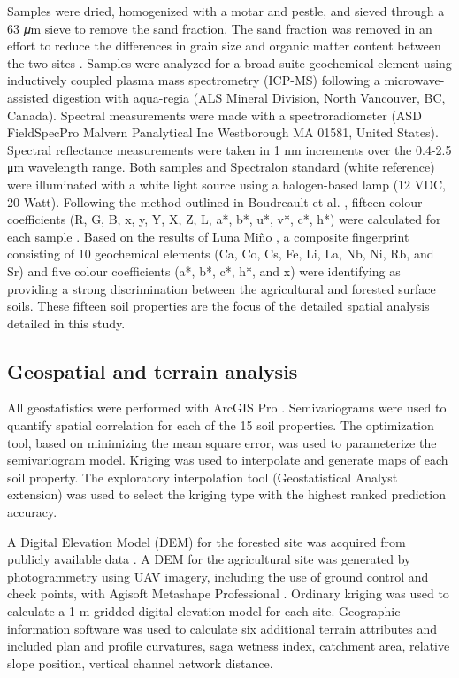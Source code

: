 \documentclass[
  number]{elsarticle}
\begin{document}
Samples were dried, homogenized with a motar and pestle, and sieved
through a 63 𝜇m sieve to remove the sand fraction. The sand fraction was
removed in an effort to reduce the differences in grain size and organic
matter content between the two sites \citep{laceby2017}. Samples were
analyzed for a broad suite geochemical element using inductively coupled
plasma mass spectrometry (ICP-MS) following a microwave-assisted
digestion with aqua-regia (ALS Mineral Division, North Vancouver, BC,
Canada). Spectral measurements were made with a spectroradiometer (ASD
FieldSpecPro Malvern Panalytical Inc Westborough MA 01581, United
States). Spectral reflectance measurements were taken in 1 nm increments
over the 0.4-2.5 μm wavelength range. Both samples and Spectralon
standard (white reference) were illuminated with a white light source
using a halogen-based lamp (12 VDC, 20 Watt). Following the method
outlined in Boudreault et al. \citep{boudreault2018}, fifteen colour
coefficients (R, G, B, x, y, Y, X, Z, L, a*, b*, u*, v*, c*, h*) were
calculated for each sample \citep{koiter2021}. Based on the results of
Luna Miño \citep{lunamiño2024}, a composite fingerprint consisting of 10
geochemical elements (Ca, Co, Cs, Fe, Li, La, Nb, Ni, Rb, and Sr) and
five colour coefficients (a*, b*, c*, h*, and x) were identifying as
providing a strong discrimination between the agricultural and forested
surface soils. These fifteen soil properties are the focus of the
detailed spatial analysis detailed in this study.

\subsection{Geospatial and terrain
analysis}\label{geospatial-and-terrain-analysis}

All geostatistics were performed with ArcGIS Pro \citep[v
3.3.0][]{esri2024}. Semivariograms were used to quantify spatial
correlation for each of the 15 soil properties. The optimization tool,
based on minimizing the mean square error, was used to parameterize the
semivariogram model. Kriging was used to interpolate and generate maps
of each soil property. The exploratory interpolation tool
(Geostatistical Analyst extension) was used to select the kriging type
with the highest ranked prediction accuracy.

A Digital Elevation Model (DEM) for the forested site was acquired from
publicly available data \citep{naturalresourcescanada2024}. A DEM for
the agricultural site was generated by photogrammetry using UAV imagery,
including the use of ground control and check points, with Agisoft
Metashape Professional \citep[v1.8.2][]{agisoft2021}. Ordinary kriging
was used to calculate a 1 m gridded digital elevation model for each
site. Geographic information software \citep[SAGA v2.1.4][]{conrad2015}
was used to calculate six additional terrain attributes and included
plan and profile curvatures, saga wetness index, catchment area,
relative slope position, vertical channel network distance.
\end{document}
